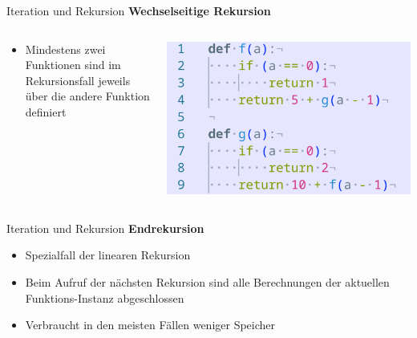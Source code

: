 \documentclass[aspectratio=169]{beamer}
\begin{document}
\begin{frame}{Iteration und Rekursion}
    \textbf{Wechselseitige Rekursion}
    \begin{columns}
        \begin{column}{0.5\textwidth}
            \begin{itemize}
                \item Mindestens zwei Funktionen sind im Rekursionsfall jeweils über die andere Funktion definiert
            \end{itemize}
        \end{column}
        \pause
        \begin{column}{0.5\textwidth}
            \begin{tcolorbox}[colframe=oxfordblue, colback=blue!10, coltitle=white, title=Python]
                \includegraphics[width=\textwidth]{images/code_wechselrecursion.png}
            \end{tcolorbox}
        \end{column}
    \end{columns}
\end{frame}

\begin{frame}{Iteration und Rekursion}
    \textbf{Endrekursion}
    \begin{itemize}
        \item Spezialfall der linearen Rekursion
        \item Beim Aufruf der nächsten Rekursion sind alle Berechnungen der aktuellen Funktions-Instanz abgeschlossen
        \item Verbraucht in den meisten Fällen weniger Speicher
    \end{itemize}
\end{frame}
\end{document}
